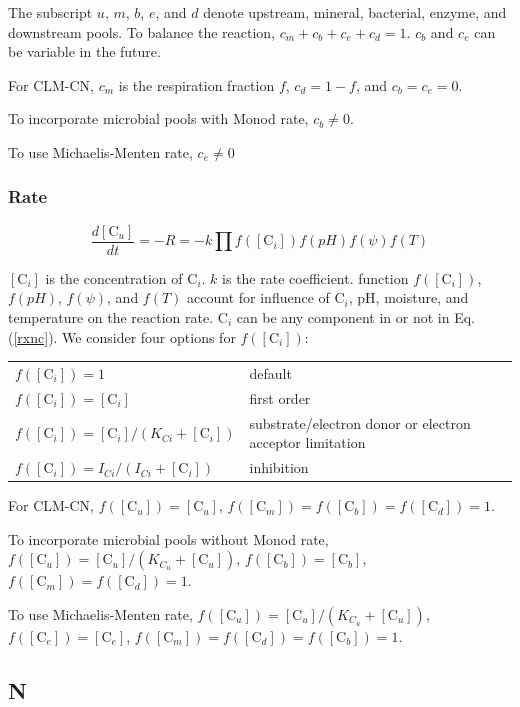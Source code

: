 \documentclass[12pt, a4paper]{article}
\begin{document}
The subscript $u$, $m$, $b$, $e$, and $d$ denote upstream, mineral, bacterial, enzyme, and downstream pools. To balance the reaction, $c_m + c_b + c_e + c_d = 1$. $c_b$ and $c_e$ can be variable in the future.

For CLM-CN, $c_m$ is the respiration fraction $f$, $c_d = 1 - f$, and $c_b = c_e = 0$.

To incorporate microbial pools with Monod rate, $c_b \neq 0$.

To use Michaelis-Menten rate, $c_e \neq 0$

\subsubsection{Rate}
\begin{equation}
\label{ratec}
\frac{d[\text{C}_u]}{dt} = -R = -k \prod f([\text{C}_i]) f(pH)f(\psi)f(T)
\end{equation}

$[\text{C}_i]$ is the concentration of C$_i$. $k$ is the rate coefficient. function $f([\text{C}_i])$, $f(pH)$, $f(\psi)$, and $f(T)$ account for influence of $\text{C}_i$, pH, moisture, and temperature on the reaction rate. $\text{C}_i$ can be any component in or not in Eq. (\ref{rxnc}). We consider four options for $f([\text{C}_i])$:

\begin{tabular}{llll}
$f([\text{C}_i]) = 1$ & default \\
$f([\text{C}_i]) = [\text{C}_i]$ & first order \\
$f([\text{C}_i]) = [\text{C}_i]/(K_{Ci} + [\text{C}_i])$ & substrate/electron donor or electron acceptor limitation \\
$f([\text{C}_i]) = I_{Ci}/(I_{Ci} + [\text{C}_i])$ & inhibition \\
\end{tabular}

For CLM-CN, $f([\text{C}_u])=[\text{C}_u]$,  $f([\text{C}_m])=f([\text{C}_b])=f([\text{C}_d]) = 1$.

To incorporate microbial pools without Monod rate, $f([\text{C}_u])=[\text{C}_u]/(K_{C_u}+[\text{C}_u])$, $f([\text{C}_b])=[\text{C}_b]$,  $f([\text{C}_m])=f([\text{C}_d]) = 1$.

To use Michaelis-Menten rate, $f([\text{C}_u])=[\text{C}_u]/(K_{C_u}+[\text{C}_u])$, $f([\text{C}_e])=[\text{C}_e]$,  $f([\text{C}_m])=f([\text{C}_d]) = f([\text{C}_b])= 1$.

\subsection{N}
\end{document}

